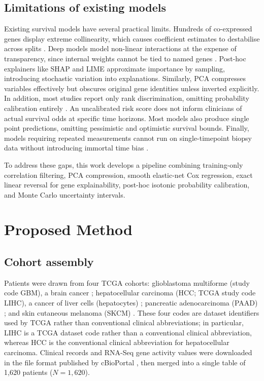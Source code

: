 \documentclass[10pt,a4paper]{article}
\begin{document}
\subsection{Limitations of existing models}
\label{sec:lit_limitations}

Existing survival models have several practical limits. Hundreds of co-expressed genes display extreme collinearity, which causes coefficient estimates to destabilise across splits \citep{simon2011regularization}. Deep models model non-linear interactions at the expense of transparency, since internal weights cannot be tied to named genes \citep{chaudhary2018deep}. Post-hoc explainers like SHAP \citep{lundberg2017unified} and LIME \citep{ribeiro2016why} approximate importance by sampling, introducing stochastic variation into explanations. Similarly, PCA compresses variables effectively but obscures original gene identities unless inverted explicitly. In addition, most studies report only rank discrimination, omitting probability calibration entirely \citep{niculescu2005predicting, zadrozny2002transforming}. An uncalibrated risk score does not inform clinicians of actual survival odds at specific time horizons. Most models also produce single point predictions, omitting pessimistic and optimistic survival bounds. Finally, models requiring repeated measurements cannot run on single-timepoint biopsy data without introducing immortal time bias \citep{suissa2008immortal}.

To address these gaps, this work develops a pipeline combining training-only correlation filtering, PCA compression, smooth elastic-net Cox regression, exact linear reversal for gene explainability, post-hoc isotonic probability calibration, and Monte Carlo uncertainty intervals.

\section{Proposed Method}
\label{sec:proposed_method}

\subsection{Cohort assembly}

Patients were drawn from four TCGA cohorts: glioblastoma multiforme (study code
GBM), a brain cancer \citep{brennan2013somatic}; hepatocellular carcinoma (HCC;
TCGA study code LIHC), a cancer of liver cells (hepatocytes)
\citep{tcga2017hepatocellular}; pancreatic adenocarcinoma (PAAD)
\citep{tcga2017pancreatic}; and skin cutaneous melanoma (SKCM)
\citep{tcga2015melanoma}. These four codes are dataset identifiers used by TCGA
rather than conventional clinical abbreviations; in particular, LIHC is a TCGA
dataset code rather than a conventional clinical abbreviation, whereas HCC is
the conventional clinical abbreviation for hepatocellular carcinoma. Clinical records and RNA-Seq
gene activity values were downloaded in the file format published by cBioPortal
\citep{cerami2012cbio, gao2013integrative}, then merged into a single table of
1,620 patients ($N = 1{,}620$).
\end{document}
